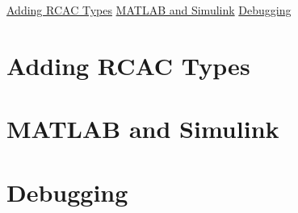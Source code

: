 \hyperlink{AddingRCACTypes}{Adding R\+C\+AC Types} \hyperlink{MATLABandSimulink}{M\+A\+T\+L\+AB and Simulink} \hyperlink{Debugging}{Debugging} \hypertarget{AddingRCACTypes}{}\section{Adding R\+C\+AC Types}\label{AddingRCACTypes}
\hypertarget{MATLABandSimulink}{}\section{M\+A\+T\+L\+AB and Simulink}\label{MATLABandSimulink}
\hypertarget{Debugging}{}\section{Debugging}\label{Debugging}
